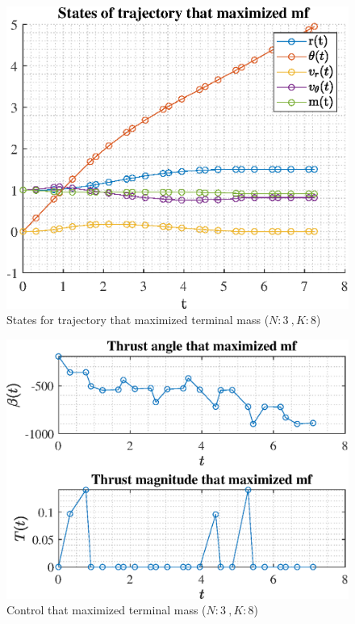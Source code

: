 \documentclass[]{article}
\begin{document}
	\begin{figure}
		\centering
		\includegraphics[scale=0.75]{states_N3_K8_C2_mf.eps}
		\caption{States for trajectory that maximized terminal mass (\(N:3\ , K:8\))}
		\label{fig:states_N3_K8_C2_mf}
	\end{figure}
	\begin{figure}
		\centering
		\includegraphics[scale=0.75]{control_N3_K8_C2_mf.eps}
		\caption{Control that maximized terminal mass (\(N:3\ , K:8\))}
		\label{fig:control_N3_K8_C2_mf}
	\end{figure}
\end{document}
